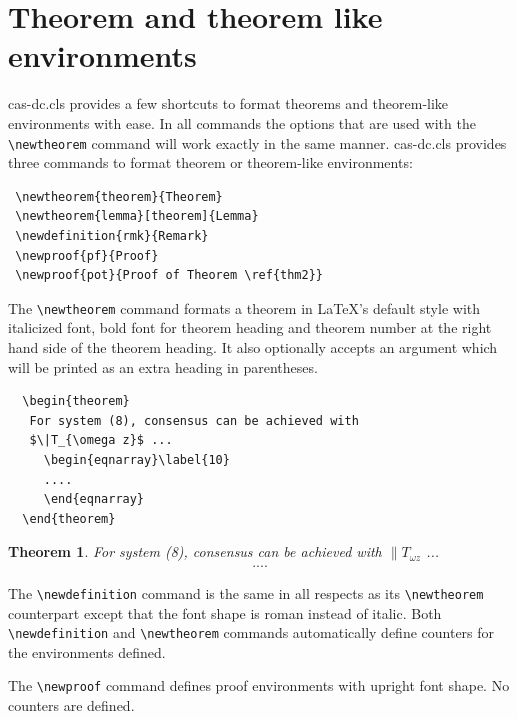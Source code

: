 \documentclass[a4paper,fleqn]{cas-dc}
\begin{document}
\section[Theorem and ...]{Theorem and theorem like environments}

{cas-dc.cls} provides a few shortcuts to format theorems and
theorem-like environments with ease. In all commands the options that
are used with the \verb+\newtheorem+ command will work exactly in the same
manner. {cas-dc.cls} provides three commands to format theorem or
theorem-like environments: 

\begin{verbatim}
 \newtheorem{theorem}{Theorem}
 \newtheorem{lemma}[theorem]{Lemma}
 \newdefinition{rmk}{Remark}
 \newproof{pf}{Proof}
 \newproof{pot}{Proof of Theorem \ref{thm2}}
\end{verbatim}


The \verb+\newtheorem+ command formats a
theorem in \LaTeX's default style with italicized font, bold font
for theorem heading and theorem number at the right hand side of the
theorem heading.  It also optionally accepts an argument which
will be printed as an extra heading in parentheses. 

\begin{verbatim}
  \begin{theorem} 
   For system (8), consensus can be achieved with 
   $\|T_{\omega z}$ ...
     \begin{eqnarray}\label{10}
     ....
     \end{eqnarray}
  \end{theorem}
\end{verbatim}  


\newtheorem{theorem}{Theorem}

\begin{theorem}
For system (8), consensus can be achieved with 
$\|T_{\omega z}$ ...
\begin{eqnarray}\label{10}
....
\end{eqnarray}
\end{theorem}

The \verb+\newdefinition+ command is the same in
all respects as its \verb+\newtheorem+ counterpart except that
the font shape is roman instead of italic.  Both
\verb+\newdefinition+ and \verb+\newtheorem+ commands
automatically define counters for the environments defined.

The \verb+\newproof+ command defines proof environments with
upright font shape.  No counters are defined. 
\end{document}
